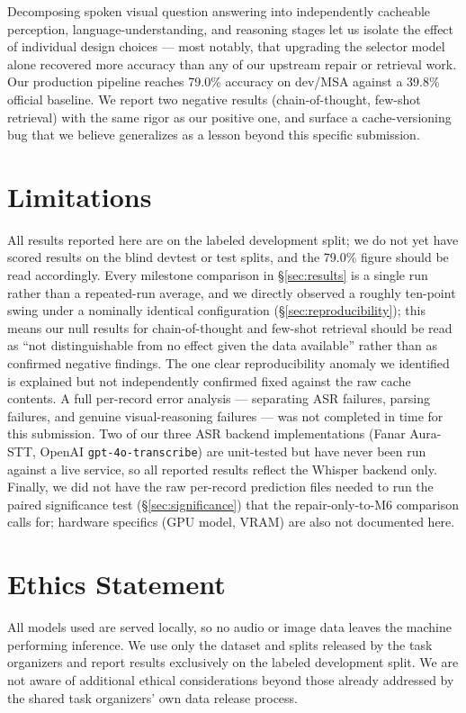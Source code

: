 \documentclass[11pt]{article}
\begin{document}
Decomposing spoken visual question answering into independently cacheable perception, language-understanding, and reasoning stages let us isolate the effect of individual design choices --- most notably, that upgrading the selector model alone recovered more accuracy than any of our upstream repair or retrieval work. Our production pipeline reaches 79.0\% accuracy on dev/MSA against a 39.8\% official baseline. We report two negative results (chain-of-thought, few-shot retrieval) with the same rigor as our positive one, and surface a cache-versioning bug that we believe generalizes as a lesson beyond this specific submission.

\section*{Limitations}
\label{sec:limitations}

All results reported here are on the labeled development split; we do not yet have scored results on the blind devtest or test splits, and the 79.0\% figure should be read accordingly. Every milestone comparison in \S\ref{sec:results} is a single run rather than a repeated-run average, and we directly observed a roughly ten-point swing under a nominally identical configuration (\S\ref{sec:reproducibility}); this means our null results for chain-of-thought and few-shot retrieval should be read as ``not distinguishable from no effect given the data available'' rather than as confirmed negative findings. The one clear reproducibility anomaly we identified is explained but not independently confirmed fixed against the raw cache contents. A full per-record error analysis --- separating ASR failures, parsing failures, and genuine visual-reasoning failures --- was not completed in time for this submission. Two of our three ASR backend implementations (Fanar Aura-STT, OpenAI \texttt{gpt-4o-transcribe}) are unit-tested but have never been run against a live service, so all reported results reflect the Whisper backend only. Finally, we did not have the raw per-record prediction files needed to run the paired significance test (\S\ref{sec:significance}) that the repair-only-to-M6 comparison calls for; hardware specifics (GPU model, VRAM) are also not documented here.

\section*{Ethics Statement}

All models used are served locally, so no audio or image data leaves the machine performing inference. We use only the dataset and splits released by the task organizers and report results exclusively on the labeled development split. We are not aware of additional ethical considerations beyond those already addressed by the shared task organizers' own data release process.
\end{document}
